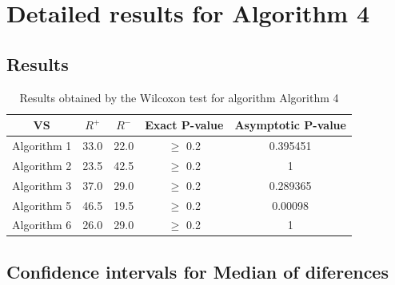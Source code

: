 \documentclass[a4paper,10pt]{article}
\begin{document}
 \clearpage 


\section{Detailed results for Algorithm 4}


\subsection{Results}

\begin{table}[!htp]
\centering\small
\begin{tabular}{
|c|c|c|c|c|}
\hline
 VS & $R^{+}$ & $R^{-}$ & Exact P-value & Asymptotic P-value \\ \hline 
Algorithm 1 & 33.0 & 22.0 & $\geq$ 0.2 & 0.395451\\ \hline 
Algorithm 2 & 23.5 & 42.5 & $\geq$ 0.2 & 1\\ \hline 
Algorithm 3 & 37.0 & 29.0 & $\geq$ 0.2 & 0.289365\\ \hline 
Algorithm 5 & 46.5 & 19.5 & $\geq$ 0.2 & 0.00098\\ \hline 
Algorithm 6 & 26.0 & 29.0 & $\geq$ 0.2 & 1\\ \hline 

\end{tabular}
\caption{Results obtained by the Wilcoxon test for algorithm Algorithm 4}
\end{table}

\subsection{Confidence intervals for Median of diferences}
\end{document}
